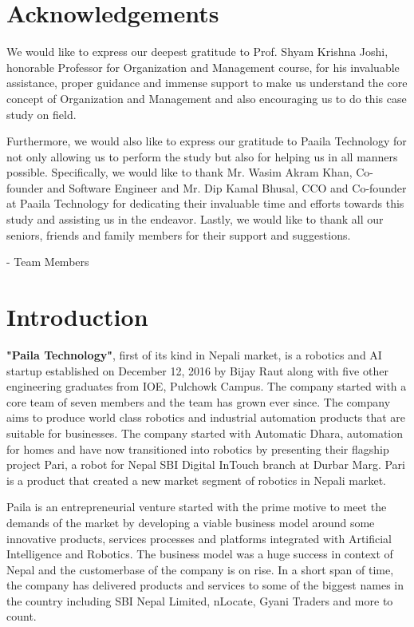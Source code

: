 \documentclass[12pt,a4paper]{scrreprt}
\begin{document}

\chapter*{Acknowledgements}
\thispagestyle{empty}
We would like to express our deepest gratitude to Prof. Shyam Krishna Joshi, honorable Professor for Organization and Management course, for his invaluable assistance, proper guidance and immense support to make us understand the core concept of Organization and Management and also encouraging us to do this case study on field.

Furthermore, we would also like to express our gratitude to Paaila Technology for not only allowing us to perform the study but also for helping us in all manners possible. Specifically, we would like to thank Mr. Wasim Akram Khan, Co-founder and Software Engineer and Mr. Dip Kamal Bhusal, CCO and Co-founder at Paaila Technology for dedicating their invaluable time and efforts towards this study and assisting us in the endeavor. Lastly, we would like to thank all our seniors, friends and family members for their support and suggestions.

- Team Members

\clearpage
\tableofcontents
\listoffigures
\clearpage
{}

\chapter{Introduction}
\textbf{"Paila Technology"}, first of its kind in Nepali market, is a robotics and AI startup established on December 12, 2016 by Bijay Raut along with five other engineering graduates from IOE, Pulchowk Campus. The company started with a core team of seven members and the team has grown ever since. The company aims to produce world class robotics and industrial automation products that are suitable for businesses.
The company started with Automatic Dhara, automation for homes and have now transitioned into robotics by presenting their flagship project Pari, a robot for Nepal SBI Digital InTouch branch at Durbar Marg. Pari is a product that created a new market segment of robotics in Nepali market.

Paila is an entrepreneurial venture started with the prime motive to meet the demands of the market by developing a viable business model around some innovative products, services processes and platforms integrated with Artificial Intelligence and Robotics. The business model was a huge success in context of Nepal and the customerbase of the company is on rise. In a short span of time, the company has delivered products and services to some of the biggest names in the country including SBI Nepal Limited, nLocate, Gyani Traders and more to count.
\end{document}
